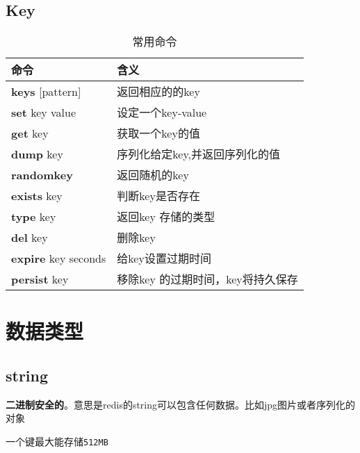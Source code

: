 \documentclass[UTF8,a4paper,12pt]{ctexbook}
\begin{document}
	\section{Key}
		\begin{table}[H]
			\centering
			\caption{常用命令}
			\begin{tabular}{p{5cm}<{\centering} | p{10cm}<{\centering}}
				\hline
					命令  &  含义 \\
				\hline
					\textbf{keys} [pattern] & 返回相应的的key \\
					\textbf{set} key value & 设定一个key-value \\
					\textbf{get} key &  获取一个key的值\\
					\textbf{dump} key & 序列化给定key,并返回序列化的值\\
					\textbf{randomkey} & 返回随机的key \\
					\textbf{exists} key & 判断key是否存在 \\
					\textbf{type} key & 返回key 存储的类型 \\
					\textbf{del} key &  删除key \\
					\textbf{expire} key seconds & 给key设置过期时间 \\
					\textbf{persist} key & 移除key 的过期时间，key将持久保存 \\
				\hline
			\end{tabular}
		\end{table}

	
	
\chapter{数据类型}	
	\section{string}
		\textbf{二进制安全的}。意思是redis的string可以包含任何数据。比如jpg图片或者序列化的对象 
		
		一个键最大能存储\verb|512MB|
		
\end{document}
